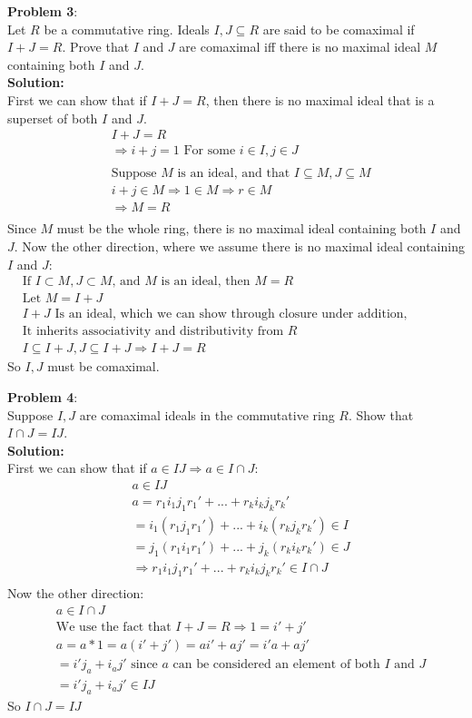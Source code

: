 \documentclass[11pt]{article}
\newcommand{\prob}[3]{\begin{flushleft}
        \textbf{Problem #1}: \\
        #2 
		\textbf{Solution:} 
		#3

\end{flushleft}}
\begin{document}
\prob{3}{
Let $R$ be a commutative ring. Ideals $I, J \subseteq R$ are said to be comaximal if $I + J = R$. Prove that $I$ and $J$ are comaximal iff there is no maximal ideal $M$ containing both $I$ and $J$.
\\
}
{\\
First we can show that if $I + J = R$, then there is no maximal ideal that is a superset of both $I$ and $J$. 
\begin{align*}
&I+J = R\\
&\Rightarrow i + j = 1 \text{ For some $i \in I, j \in J$}\\
&\\
&\text{Suppose $M$ is an ideal, and that } I \subseteq M, J \subseteq M\\
&i + j \in M \Rightarrow 1 \in M \Rightarrow r \in M\\
&\Rightarrow M = R\\
\end{align*}
Since $M$ must be the whole ring, there is no maximal ideal containing both $I$ and $J$. Now the other direction, where we assume there is no maximal ideal containing $I$ and $J$:
\begin{align*}
&\text{If $I \subset M, J \subset M$, and $M$ is an ideal, then } M = R\\
&\text{Let } M = I + J\\
&I + J \text{ Is an ideal, which we can show through closure under addition, multiplication, etc.}\\
&\text{It inherits associativity and distributivity from $R$}\\
&I \subseteq I + J, J \subseteq I + J \Rightarrow I+J = R
\end{align*}
So $I, J$ must be comaximal.
}

\prob{4}{
Suppose $I, J$ are comaximal ideals in the commutative ring $R$. Show that $I \cap J = IJ$.
\\
}
{\\
First we can show that if $a \in IJ \Rightarrow a \in I \cap J$:
\begin{align*}
&a \in IJ\\
&a = r_1i_1j_1r_1' + ... + r_ki_kj_kr_k'\\
& = i_1(r_1j_1r_1') + ... + i_k(r_kj_kr_k') \in I\\
& = j_1(r_1i_1r_1') + ... + j_k(r_ki_kr_k') \in J\\
&\Rightarrow r_1i_1j_1r_1' + ... + r_ki_kj_kr_k' \in I \cap J\\
\end{align*}
Now the other direction:
\begin{align*}
&a \in I \cap J\\
&\text{We use the fact that } I + J = R \Rightarrow 1 = i' + j'\\
&a = a*1 = a(i' + j') = ai' + aj' = i'a + aj'\\
& = i'j_a + i_aj' \text{ since $a$ can be considered an element of both $I$ and $J$}\\
& = i'j_a + i_aj' \in IJ
\end{align*}
So $I \cap J = IJ$\\
}
\end{document}
